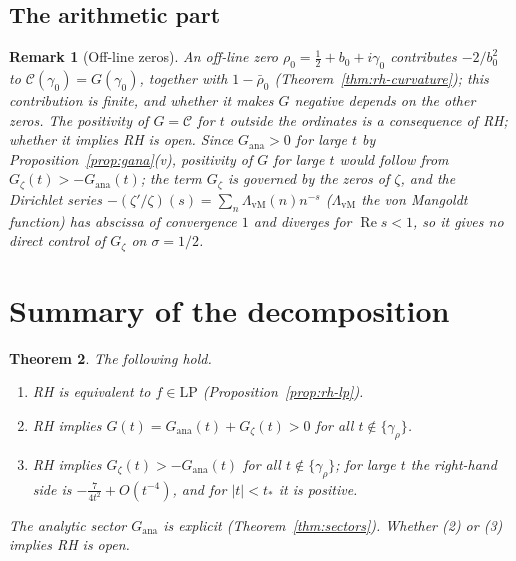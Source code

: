 \documentclass[11pt]{amsart}
\newtheorem{theorem}{Theorem}[section]
\newtheorem{remark}[theorem]{Remark}
\renewcommand{\Re}{\operatorname{Re}}
\newcommand{\LP}{\mathrm{LP}}
\begin{document}
\subsection{The arithmetic part}

\begin{remark}[Off-line zeros]\label{prop:wall}
An off-line zero $\rho_0=\tfrac12+b_0+i\gamma_0$ contributes $-2/b_0^2$ to
$\mathcal C(\gamma_0)=G(\gamma_0)$, together with $1-\bar\rho_0$
(Theorem~\ref{thm:rh-curvature}); this contribution is finite, and whether it makes $G$
negative depends on the other zeros. The positivity of $G=\mathcal C$ for $t$ outside the
ordinates is a consequence of RH; whether it implies RH is open. Since $G_{\mathrm{ana}}>0$
for large $t$ by Proposition~\ref{prop:gana}(v), positivity of $G$ for large $t$ would follow
from $G_\zeta(t)>-G_{\mathrm{ana}}(t)$; the term $G_\zeta$ is governed by the zeros of $\zeta$,
and the Dirichlet series $-(\zeta'/\zeta)(s)=\sum_n\Lambda_{\mathrm{vM}}(n)n^{-s}$ ($\Lambda_{\mathrm{vM}}$ the von
Mangoldt function) has abscissa of convergence $1$ and diverges for $\Re s<1$, so it gives no direct control of $G_\zeta$
on $\sigma=1/2$.
\end{remark}

\section{Summary of the decomposition}
\label{sec:wall}

\begin{theorem}\label{thm:wall}
The following hold.
\begin{enumerate}
  \item[\rm(1)] RH is equivalent to $f \in \LP$ (Proposition~\ref{prop:rh-lp}).
  \item[\rm(2)] RH implies $G(t) = G_{\mathrm{ana}}(t) + G_\zeta(t) > 0$ for all
    $t \notin \{\gamma_\rho\}$.
  \item[\rm(3)] RH implies $G_\zeta(t) > -G_{\mathrm{ana}}(t)$ for all
    $t \notin \{\gamma_\rho\}$; for large $t$ the right-hand side is
    $-\tfrac{7}{4t^2}+O(t^{-4})$, and for $|t|<t_*$ it is positive.
\end{enumerate}
The analytic sector $G_{\mathrm{ana}}$ is explicit (Theorem~\ref{thm:sectors}).
Whether {\rm(2)} or {\rm(3)} implies RH is open.
\end{theorem}
\end{document}
